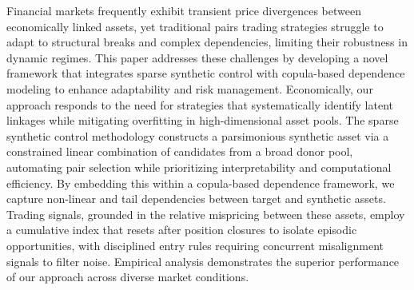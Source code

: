 Financial markets frequently exhibit transient price divergences between economically linked assets, yet traditional pairs trading strategies struggle to adapt to structural breaks and complex dependencies, limiting their robustness in dynamic regimes. 
%
This paper addresses these challenges by developing a novel framework that integrates sparse synthetic control with copula-based dependence modeling to enhance adaptability and risk management. 
%
Economically, our approach responds to the need for strategies that systematically identify latent linkages while mitigating overfitting in high-dimensional asset pools. 
%
The sparse synthetic control methodology constructs a parsimonious synthetic asset via a constrained linear combination of candidates from a broad donor pool, automating pair selection while prioritizing interpretability and computational efficiency. 
%
By embedding this within a copula-based dependence framework, we capture non-linear and tail dependencies between target and synthetic assets. 
%
Trading signals, grounded in the relative mispricing between these assets, employ a cumulative index that resets after position closures to isolate episodic opportunities, with disciplined entry rules requiring concurrent misalignment signals to filter noise. 
%
Empirical analysis demonstrates the superior performance of our approach across diverse market conditions. 